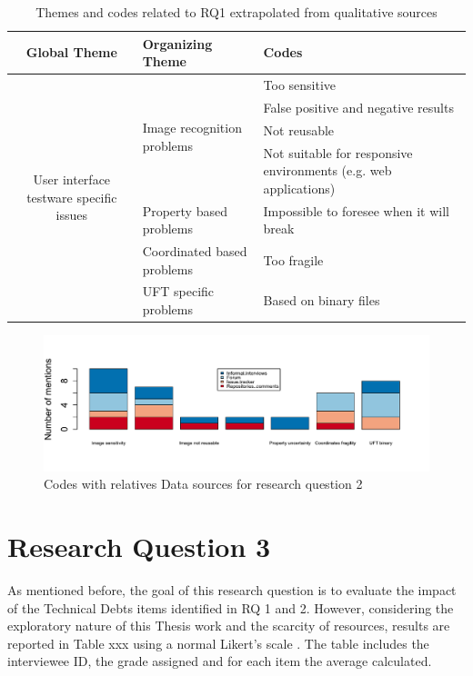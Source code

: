   
\begin{table}
\renewcommand{\arraystretch}{1.5}
\centering
\begin{tabular}{ c p{4.3cm} p{4.6cm}}
    
    \hline       
    {\large Global Theme} & {\large Organizing Theme} & {\large Codes}\\
    \hline
    
    \multirow{7}{*}{\parbox[b]{4.3cm}{
        User interface testware specific issues
    }
    } & \multirow{4}{*}{\parbox[c]{4.3cm}{Image recognition problems}}
        & Too sensitive \\
        & & False positive and negative results\\
        & & Not reusable\\ 
        & & Not suitable for responsive environments (e.g. web applications)\\ \cline{2-3}
        
    & Property based problems & Impossible to foresee when it will break\\ \cline{2-3}
        
    & Coordinated based problems  & Too fragile\\ \cline{2-3}
        
    & UFT specific problems & Based on binary files\\
        
    \hline
\end{tabular}
\caption{Themes and codes related to RQ1 extrapolated from qualitative sources}
\label{tab:themes_rq2}
\end{table}

\begin{figure}[!htbp]
    \centering
    \includegraphics[width=\textwidth,keepaspectratio]{figure/results/rq2/sources.pdf}
    \caption{Codes with relatives Data sources for research question 2}
    \label{fig:rq2_sources}
\end{figure}

\FloatBarrier

\section{Research Question 3}
As mentioned before, the goal of this research question is to evaluate the impact of the Technical Debts items identified in RQ 1 and 2. However, considering the exploratory nature of this Thesis work and the scarcity of resources, results are reported in Table xxx using a normal Likert's scale \cite{likert-scale}. The table includes the interviewee ID, the grade assigned and for each item the average calculated.



